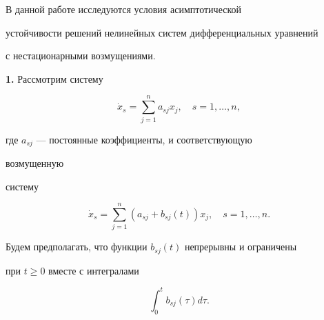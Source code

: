  


\pagestyle{plain} %


 


 




 


\maketitle 


 


 


 


В данной работе исследуются условия асимптотической 


устойчивости решений нелинейных систем дифференциальных уравнений 


с нестационарными возмущениями. 


 


{\bf 1.} Рассмотрим систему 


\begin{equation} 


\Dot x_s=\sum^n_{j=1}a_{sj}x_j,\quad s=1,\dotsc,n, 


\end{equation} 


где $a_{sj}$ --- постоянные коэффициенты, и соответствующую 


возмущенную 


систему 


\begin{equation} 


\Dot x_s=\sum^n_{j=1}(a_{sj}+b_{sj}(t))x_j,\quad s=1,\dotsc,n. 


\end{equation} 


Будем предполагать, что функции $b_{sj}(t)$ непрерывны и ограничены 


при $t\ge 0$ вместе с интегралами 


\begin{equation} 


\int^t_0 b_{sj}(\tau)d\tau. 


\end{equation} 


 


